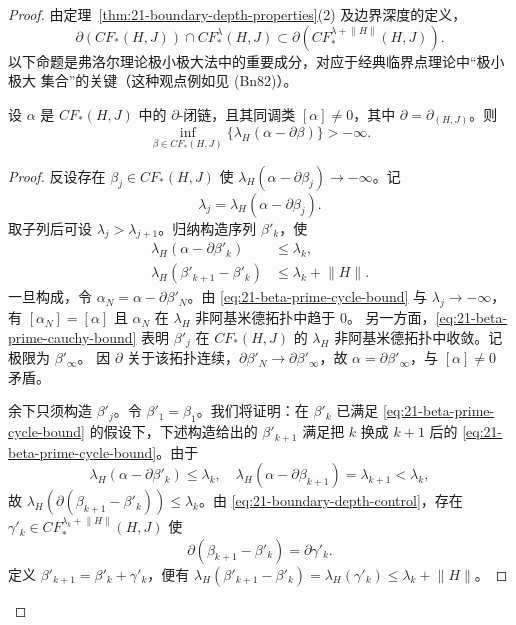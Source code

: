\begin{proof}
由定理~\ref{thm:21-boundary-depth-properties}(2) 及边界深度的定义，
\begin{equation}
 \partial(CF_*(H,J))\cap CF_*^\lambda(H,J)
 \subset\partial(CF_*^{\lambda+\lVert H\rVert}(H,J)).
 \label{eq:21-boundary-depth-control}
\end{equation}
以下命题是弗洛尔理论极小极大法中的重要成分，对应于经典临界点理论中“极小极大
集合”的关键\emph{\termLinkingProperty{}}（这种观点例如见 (Bn82)）。

\begin{proposition}
\label{prop:21-floer-minimax-lower-bound}
设 $\alpha$ 是 $CF_*(H,J)$ 中的 $\partial$-闭链，且其同调类
$[\alpha]\neq0$，其中 $\partial=\partial_{(H,J)}$。则
\begin{equation}
 \inf_{\beta\in CF_*(H,J)}\{\lambda_H(\alpha-\partial\beta)\}>-\infty.
 \label{eq:21-minimax-finite}
\end{equation}
\end{proposition}

\begin{proof}
反设存在 $\beta_j\in CF_*(H,J)$ 使
$\lambda_H(\alpha-\partial\beta_j)\to-\infty$。记
\begin{equation}
 \lambda_j=\lambda_H(\alpha-\partial\beta_j).
 \label{eq:21-lambda-sequence}
\end{equation}
取子列后可设 $\lambda_j>\lambda_{j+1}$。归纳构造序列 $\beta'_k$，使
\begin{align}
 \lambda_H(\alpha-\partial\beta'_k)&\leq\lambda_k,
 \label{eq:21-beta-prime-cycle-bound}\\
 \lambda_H(\beta'_{k+1}-\beta'_k)&\leq\lambda_k+\lVert H\rVert.
 \label{eq:21-beta-prime-cauchy-bound}
\end{align}
一旦构成，令 $\alpha_N=\alpha-\partial\beta'_N$。由
\eqref{eq:21-beta-prime-cycle-bound} 与 $\lambda_j\to-\infty$，有
$[\alpha_N]=[\alpha]$ 且 $\alpha_N$ 在 $\lambda_H$ 非阿基米德拓扑中趋于 $0$。
另一方面，\eqref{eq:21-beta-prime-cauchy-bound} 表明 $\beta'_j$ 在
$CF_*(H,J)$ 的 $\lambda_H$ 非阿基米德拓扑中收敛。记极限为 $\beta'_\infty$。
因 $\partial$ 关于该拓扑连续，$\partial\beta'_N\to\partial\beta'_\infty$，故
$\alpha=\partial\beta'_\infty$，与 $[\alpha]\neq0$ 矛盾。

余下只须构造 $\beta'_j$。令 $\beta'_1=\beta_1$。我们将证明：在 $\beta'_k$ 已满足
\eqref{eq:21-beta-prime-cycle-bound} 的假设下，下述构造给出的 $\beta'_{k+1}$
满足把 $k$ 换成 $k+1$ 后的 \eqref{eq:21-beta-prime-cycle-bound}。由于
\[
 \lambda_H(\alpha-\partial\beta'_k)\leq\lambda_k,
 \quad \lambda_H(\alpha-\partial\beta_{k+1})=\lambda_{k+1}<\lambda_k,
\]
故 $\lambda_H(\partial(\beta_{k+1}-\beta'_k))\leq\lambda_k$。由
\eqref{eq:21-boundary-depth-control}，存在
$\gamma'_k\in CF_*^{\lambda_k+\lVert H\rVert}(H,J)$ 使
\[
 \partial(\beta_{k+1}-\beta'_k)=\partial\gamma'_k.
\]
定义 $\beta'_{k+1}=\beta'_k+\gamma'_k$，便有
$\lambda_H(\beta'_{k+1}-\beta'_k)=\lambda_H(\gamma'_k)\leq\lambda_k+\lVert H\rVert$。


\end{proof}
\end{proof}
